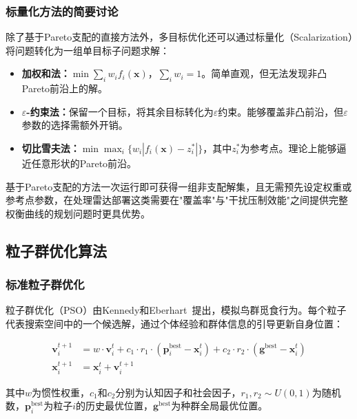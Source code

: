 \subsubsection{标量化方法的简要讨论}

除了基于Pareto支配的直接方法外，多目标优化还可以通过标量化（Scalarization）将问题转化为一组单目标子问题求解：

\begin{itemize}
    \item \textbf{加权和法：}$\min \sum_i w_i f_i(\mathbf{x})$，$\sum_i w_i = 1$。简单直观，但无法发现非凸Pareto前沿上的解。
    \item \textbf{$\varepsilon$-约束法：}保留一个目标，将其余目标转化为$\varepsilon$约束。能够覆盖非凸前沿，但$\varepsilon$参数的选择需额外开销。
    \item \textbf{切比雪夫法：}$\min \max_i \{w_i |f_i(\mathbf{x}) - z_i^*|\}$，其中$z_i^*$为参考点。理论上能够逼近任意形状的Pareto前沿\cite{Zhang2007}。
\end{itemize}

基于Pareto支配的方法一次运行即可获得一组非支配解集，且无需预先设定权重或参考点参数，在处理雷达部署这类需要在"覆盖率"与"干扰压制效能"之间提供完整权衡曲线的规划问题时更具优势。

\subsection{粒子群优化算法}

\subsubsection{标准粒子群优化}

粒子群优化（PSO）由Kennedy和Eberhart~\cite{Kennedy1995}提出，模拟鸟群觅食行为。每个粒子代表搜索空间中的一个候选解，通过个体经验和群体信息的引导更新自身位置：

\begin{align}
\mathbf{v}_i^{t+1} &= w \cdot \mathbf{v}_i^t + c_1 \cdot r_1 \cdot (\mathbf{p}_i^{\text{best}} - \mathbf{x}_i^t) + c_2 \cdot r_2 \cdot (\mathbf{g}^{\text{best}} - \mathbf{x}_i^t) \label{eq:pso_velocity} \\
\mathbf{x}_i^{t+1} &= \mathbf{x}_i^t + \mathbf{v}_i^{t+1} \label{eq:pso_position}
\end{align}

其中$w$为惯性权重，$c_1$和$c_2$分别为认知因子和社会因子，$r_1, r_2 \sim U(0,1)$为随机数，$\mathbf{p}_i^{\text{best}}$为粒子$i$的历史最优位置，$\mathbf{g}^{\text{best}}$为种群全局最优位置。

